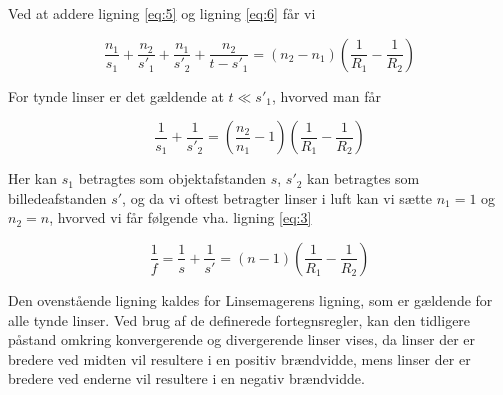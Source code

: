 \noindent Ved at addere ligning \eqref{eq:5} og ligning \eqref{eq:6} får vi

\begin{equation}
\frac{n_1}{s_1}+\frac{n_2}{s'_1} + \frac{n_1}{s'_2} + \frac{n_2}{t-s'_1} = (n_2 - n_1) \left( \frac{1}{R_1} - \frac{1}{R_2} \right)
\end{equation}

\noindent For tynde linser er det gældende at $t\ll s'_1$, hvorved man får

\begin{equation}
\frac{1}{s_1}+\frac{1}{s'_2} = \left(\frac{n_2}{n_1}-1\right)\left( \frac{1}{R_1}-\frac{1}{R_2} \right)
\end{equation}

\noindent Her kan $s_1$ betragtes som objektafstanden $s$, $s'_2$ kan betragtes som billedeafstanden $s'$, og da vi oftest betragter linser i luft kan vi sætte $n_1=1$ og $n_2=n$, hvorved vi får følgende vha. ligning \eqref{eq:3}

\begin{equation}
\frac{1}{f} = \frac{1}{s} + \frac{1}{s'} = (n-1)\left( \frac{1}{R_1} - \frac{1}{R_2}\right)
\end{equation}

\noindent Den ovenstående ligning kaldes for Linsemagerens ligning, som er gældende for alle tynde linser. Ved brug af de definerede fortegnsregler, kan den tidligere påstand omkring konvergerende og divergerende linser vises, da linser der er bredere ved midten vil resultere i en positiv brændvidde, mens linser der er bredere ved enderne vil resultere i en negativ brændvidde. 

